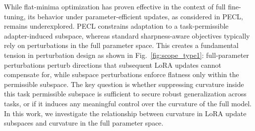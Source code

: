 \documentclass{article}
\theoremstyle{plain}
\theoremstyle{definition}
\theoremstyle{remark}
\begin{document}

While flat-minima optimization has proven effective in the context of full fine-tuning, its behavior under parameter-efficient updates, as considered in PECL, remains underexplored.
PECL constrains adaptation to a task-permissible adapter-induced subspace, whereas standard sharpness-aware objectives typically rely on perturbations in the full parameter space. This creates a fundamental tension in perturbation design as shown in Fig.~\ref{fig:scope_type1}: full-parameter perturbations perturb directions that subsequent LoRA updates cannot compensate for, while subspace perturbations enforce flatness only within the permissible subspace. The key question is whether suppressing curvature inside this task permissible subspace is sufficient to secure robust generalization across tasks, or if it induces any meaningful control over the curvature of the full model. In this work, we investigate the relationship between curvature in LoRA update subspaces and curvature in the full parameter space. 







\end{document}
